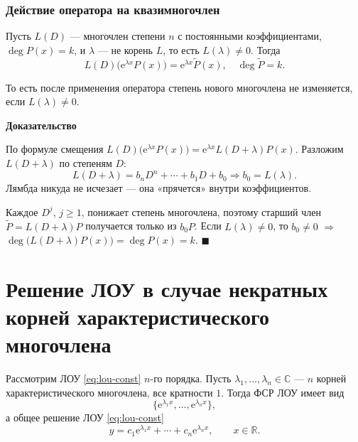 \documentclass[12pt,a4paper]{article}
\numberwithin{equation}{section}
\newcommand{\R}{\mathbb{R}}
\newcommand{\e}{\mathrm{e}}
\renewenvironment{proof}[1][Доказательство]{\begin{center}\textbf{#1}\end{center}}{\hfill$\blacksquare$\par}
\DeclareRobustCommand{\examtag}[1]{\space{\normalfont\small\color{HSEgray}(#1)}}
\begin{document}
\subsubsection{Действие оператора на квазимногочлен\examtag{вопрос~21}}

\begin{theoremHSE}
Пусть \(L(D)\) --- многочлен степени \(n\) с постоянными коэффициентами, \(\deg P(x)=k\), и \(\lambda\) --- не корень \(L\), то есть \(L(\lambda)\neq0\). Тогда
\[
L(D)\bigl(\e^{\lambda x}P(x)\bigr)=\e^{\lambda x}\tilde P(x),\quad\deg\tilde P=k.
\]
\end{theoremHSE}
То есть после применения оператора степень нового многочлена не изменяется, если \(L(\lambda)\neq0\).

\begin{proof}
По формуле смещения \(L(D)\bigl(\e^{\lambda x}P(x)\bigr)=\e^{\lambda x}L(D+\lambda)P(x)\). Разложим \(L(D+\lambda)\) по степеням \(D\):
\[
L(D+\lambda)=b_nD^n+\cdots+b_1D+b_0\Rightarrow b_0=L(\lambda).
\]
Лямбда никуда не исчезает --- она «прячется» внутри коэффициентов.

Каждое \(D^j\), \(j\ge1\), понижает степень многочлена, поэтому старший член \(\tilde P=L(D+\lambda)P\) получается только из \(b_0P\). Если \(L(\lambda)\neq0\), то \(b_0\neq0\) \(\Rightarrow\) \(\deg\bigl(L(D+\lambda)P(x)\bigr)=\deg P(x)=k\).
\end{proof}

\section[Некратные корни характеристического многочлена\examtag{вопрос~19}]{Решение ЛОУ в случае некратных корней характеристического многочлена\examtag{вопрос~19}}
\label{sec:roots-simple}

\begin{theoremHSE}
Рассмотрим ЛОУ \eqref{eq:lou-const} \(n\)-го порядка. Пусть \(\lambda_1,\ldots,\lambda_n\in\mathbb C\) --- \(n\) корней характеристического многочлена, все кратности \(1\). Тогда ФСР ЛОУ имеет вид
\begin{equation}
\bigl\{\e^{\lambda_1x},\ldots,\e^{\lambda_nx}\bigr\},
\label{eq:fsr-simple}
\end{equation}
а общее решение ЛОУ \eqref{eq:lou-const}
\begin{equation}
y=c_1\e^{\lambda_1x}+\cdots+c_n\e^{\lambda_nx},\qquad x\in\R.
\label{eq:gen-simple}
\end{equation}
\end{theoremHSE}
\end{document}
